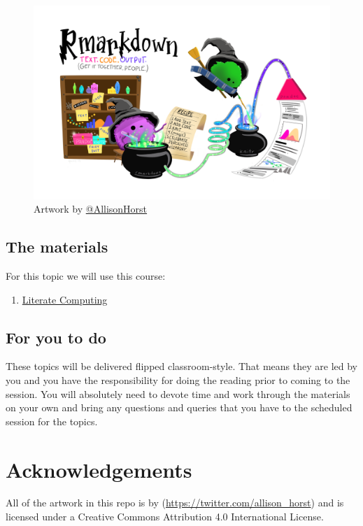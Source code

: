 \documentclass[
]{book}
\providecommand{\tightlist}{%
  \setlength{\itemsep}{0pt}\setlength{\parskip}{0pt}}
\begin{document}
\begin{figure}
\centering
\includegraphics{rmarkdown_wizards.png}
\caption{\label{fig:unnamed-chunk-9}Artwork by \href{https://github.com/allisonhorst}{@AllisonHorst}}
\end{figure}

\hypertarget{the-materials-6}{%
\section{The materials}\label{the-materials-6}}

For this topic we will use this course:

\begin{enumerate}
\def\labelenumi{\arabic{enumi}.}
\tightlist
\item
  \href{https://danmaclean.github.io/literate_computing/}{Literate Computing}
\end{enumerate}

\hypertarget{for-you-to-do-6}{%
\section{For you to do}\label{for-you-to-do-6}}

These topics will be delivered flipped classroom-style. That means they are led by you and you have the responsibility for doing the reading prior to coming to the session. You will absolutely need to devote time and work through the materials on your own and bring any questions and queries that you have to the scheduled session for the topics.

\hypertarget{acknowledgements}{%
\chapter{Acknowledgements}\label{acknowledgements}}

All of the artwork in this repo is by \citep[\textbackslash{}][]{allison_horst}(\url{https://twitter.com/allison_horst}) and is licensed under a Creative Commons Attribution 4.0 International License.

  
\end{document}
